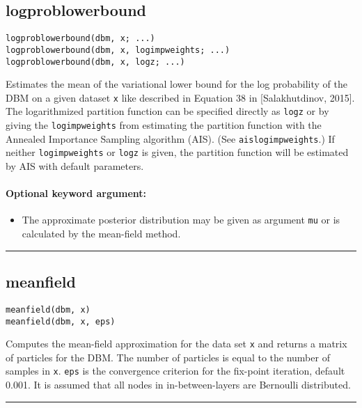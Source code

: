 \subsection*{logproblowerbound}
\begin{verbatim}
logproblowerbound(dbm, x; ...)
logproblowerbound(dbm, x, logimpweights; ...)
logproblowerbound(dbm, x, logz; ...)
\end{verbatim}
Estimates the mean of the variational lower bound for the log probability of the DBM on a given dataset \texttt{x} like described in Equation 38 in [Salakhutdinov, 2015]. The logarithmized partition function can be specified directly as \texttt{logz} or by giving the \texttt{logimpweights} from estimating the partition function with the Annealed Importance Sampling algorithm (AIS). (See \texttt{aislogimpweights}.) If neither \texttt{logimpweights} or \texttt{logz} is given, the partition function will be estimated by AIS with default parameters.

\paragraph*{Optional keyword argument:}
\begin{itemize}
\item The approximate posterior distribution may be given as argument \texttt{mu} or is calculated by the mean-field method.

\end{itemize}
\noindent\rule{\textwidth}{1pt}
\subsection*{meanfield}
\begin{verbatim}
meanfield(dbm, x)
meanfield(dbm, x, eps)
\end{verbatim}
Computes the mean-field approximation for the data set \texttt{x} and returns a matrix of particles for the DBM. The number of particles is equal to the number of samples in \texttt{x}. \texttt{eps} is the convergence criterion for the fix-point iteration, default 0.001. It is assumed that all nodes in in-between-layers are Bernoulli distributed.

\noindent\rule{\textwidth}{1pt}
